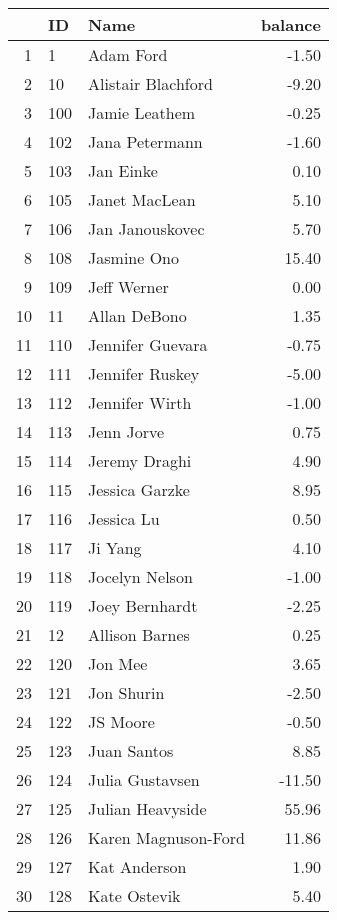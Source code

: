 \begin{table}[ht]
\centering
\begin{tabular}{rllr}
  \hline
 & ID & Name & balance \\ 
  \hline
1 & 1 & Adam Ford & -1.50 \\ 
  2 & 10 & Alistair Blachford & -9.20 \\ 
  3 & 100 & Jamie Leathem & -0.25 \\ 
  4 & 102 & Jana Petermann & -1.60 \\ 
  5 & 103 & Jan Einke & 0.10 \\ 
  6 & 105 & Janet MacLean & 5.10 \\ 
  7 & 106 & Jan Janouskovec & 5.70 \\ 
  8 & 108 & Jasmine Ono & 15.40 \\ 
  9 & 109 & Jeff Werner & 0.00 \\ 
  10 & 11 & Allan DeBono & 1.35 \\ 
  11 & 110 & Jennifer Guevara & -0.75 \\ 
  12 & 111 & Jennifer Ruskey & -5.00 \\ 
  13 & 112 & Jennifer Wirth & -1.00 \\ 
  14 & 113 & Jenn Jorve & 0.75 \\ 
  15 & 114 & Jeremy Draghi & 4.90 \\ 
  16 & 115 & Jessica Garzke & 8.95 \\ 
  17 & 116 & Jessica Lu & 0.50 \\ 
  18 & 117 & Ji Yang & 4.10 \\ 
  19 & 118 & Jocelyn Nelson & -1.00 \\ 
  20 & 119 & Joey Bernhardt & -2.25 \\ 
  21 & 12 & Allison Barnes & 0.25 \\ 
  22 & 120 & Jon Mee & 3.65 \\ 
  23 & 121 & Jon Shurin & -2.50 \\ 
  24 & 122 & JS Moore & -0.50 \\ 
  25 & 123 & Juan Santos & 8.85 \\ 
  26 & 124 & Julia Gustavsen & -11.50 \\ 
  27 & 125 & Julian Heavyside & 55.96 \\ 
  28 & 126 & Karen Magnuson-Ford & 11.86 \\ 
  29 & 127 & Kat Anderson & 1.90 \\ 
  30 & 128 & Kate Ostevik & 5.40 \\ 

\end{tabular}
\end{table}
